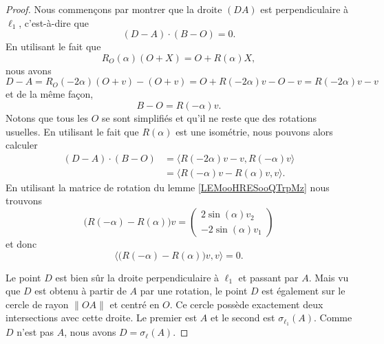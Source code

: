 \begin{proof}
	Nous commençons par montrer que la droite \( (DA)\) est perpendiculaire à \( \ell_1\), c'est-à-dire que
	\begin{equation}
		(D-A)\cdot (B-O)=0.
	\end{equation}
	En utilisant le fait que
	\begin{equation}
		R_O(\alpha)(O+X)=O+R(\alpha)X,
	\end{equation}
	nous avons
	\begin{equation}
		D-A=R_O(-2\alpha)(O+v)-(O+v)=O+R(-2\alpha)v-O-v=R(-2\alpha)v-v
	\end{equation}
	et de la même façon,
	\begin{equation}
		B-O=R(-\alpha)v.
	\end{equation}
	Notons que tous les \( O\) se sont simplifiés et qu'il ne reste que des rotations usuelles. En utilisant le fait que \( R(\alpha)\) est une isométrie, nous pouvons alors calculer
	\begin{subequations}
		\begin{align}
			(D-A)\cdot (B-O) & =\langle R(-2\alpha)v-v, R(-\alpha)v\rangle \\
			                 & =\langle R(-\alpha)v-R(\alpha)v, v\rangle.
		\end{align}
	\end{subequations}
	En utilisant la matrice de rotation du lemme \ref{LEMooHRESooQTrpMz} nous trouvons
	\begin{equation}
		\big( R(-\alpha)-R(\alpha) \big)v=\begin{pmatrix}
			2\sin(\alpha)v_2 \\
			-2\sin(\alpha)v_1
		\end{pmatrix}
	\end{equation}
	et donc
	\begin{equation}
		\langle  \big( R(-\alpha)-R(\alpha) \big)v  , v\rangle =0.
	\end{equation}

	Le point \( D\) est bien sûr la droite perpendiculaire à \( \ell_1\) et passant par \( A\). Mais vu que \( D\) est obtenu à partir de \( A\) par une rotation, le point \( D\) est également sur le cercle de rayon \( \| OA \|\) et centré en \( O\). Ce cercle possède exactement deux intersections avec cette droite. Le premier est \( A\) et le second est \( \sigma_{\ell_1}(A)\). Comme \( D\) n'est pas \( A\), nous avons \( D=\sigma_{\ell}(A)\).
\end{proof}

